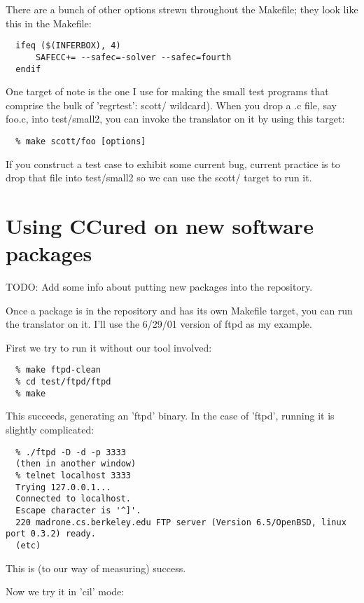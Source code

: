 \documentclass{book}
\begin{document}
There are a bunch of other options strewn throughout the Makefile; they
look like this in the Makefile:

\begin{verbatim}
  ifeq ($(INFERBOX), 4)
      SAFECC+= --safec=-solver --safec=fourth
  endif
\end{verbatim}%

One target of note is the one I use for making the small test programs
that comprise the bulk of 'regrtest': scott/%
wildcard).  When you drop a .c file, say foo.c, into test/small2, you
can invoke the translator on it by using this target:

\begin{verbatim}
  % make scott/foo [options]
\end{verbatim}

If you construct a test case to exhibit some current bug, current
practice is to drop that file into test/small2 so we can use the scott/%
target to run it.

\chapter{Using CCured on new software packages}

TODO: Add some info about putting new packages into the repository.

Once a package is in the repository and has its own Makefile target,
you can run the translator on it.  I'll use the 6/29/01 version of ftpd
as my example.

First we try to run it without our tool involved:

\begin{verbatim}
  % make ftpd-clean
  % cd test/ftpd/ftpd
  % make
\end{verbatim}
  
This succeeds, generating an 'ftpd' binary.  In the case of 'ftpd', 
running it is slightly complicated:

\begin{verbatim}
  % ./ftpd -D -d -p 3333
  (then in another window)
  % telnet localhost 3333
  Trying 127.0.0.1...
  Connected to localhost.
  Escape character is '^]'.
  220 madrone.cs.berkeley.edu FTP server (Version 6.5/OpenBSD, linux port 0.3.2) ready.
  (etc)
\end{verbatim}
  
This is (to our way of measuring) success.

Now we try it in 'cil' mode:
\end{document}
